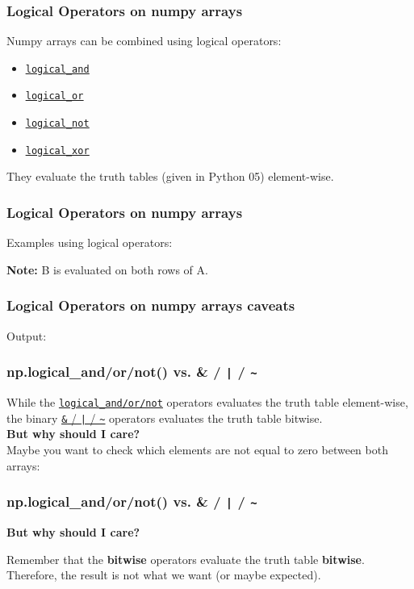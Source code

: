 \documentclass{beamer}
\newcommand{\hrefu}[2]{\underline{\href{#1}{#2}}}
\begin{document}
\begin{frame}
  \frametitle{Logical Operators on numpy arrays}
  Numpy arrays can be combined using logical operators: 
  \begin{itemize}
    \item \hrefu{https://numpy.org/doc/stable/reference/routines.logic.html}{\texttt{logical\_and}}
    \item \hrefu{https://numpy.org/doc/stable/reference/routines.logic.html}{\texttt{logical\_or}}
    \item \hrefu{https://numpy.org/doc/stable/reference/routines.logic.html}{\texttt{logical\_not}}
    \item \hrefu{https://numpy.org/doc/stable/reference/routines.logic.html}{\texttt{logical\_xor}}
  \end{itemize}
They evaluate the truth tables (given in Python 05) element-wise.
\end{frame}
\begin{frame}
  \frametitle{Logical Operators on numpy arrays}
  Examples using logical operators:
  
  \textbf{Note:} B is evaluated on both rows of A.
\end{frame}
\begin{frame}
  \frametitle{Logical Operators on numpy arrays caveats}
 
  Output:
  
\end{frame}
\begin{frame}
  \frametitle{np.logical\_and/or/not() vs. \& / \texttt{|} / \texttt{\~{}} }
  While the \hrefu{https://numpy.org/doc/stable/reference/routines.logic.html}{\texttt{logical\_and/or/not}} operators evaluates the truth table element-wise, the binary \hrefu{https://www.w3schools.com/python/gloss_python_bitwise_operators.asp}{\texttt{\&} / \texttt{|} / \texttt{\~{}}} operators evaluates the truth table bitwise.\\
  \textbf{But why should I care?}\\
  Maybe you want to check which elements are not equal to zero between both arrays: 
  
\end{frame}
\begin{frame}
  \frametitle{np.logical\_and/or/not() vs. \& / \texttt{|} / \texttt{\~{}} }
  \textbf{But why should I care?}
  
  Remember that the \textbf{bitwise} operators evaluate the truth table \textbf{bitwise}. Therefore, the result is not what we want (or maybe expected).
\end{frame}
\end{document}
